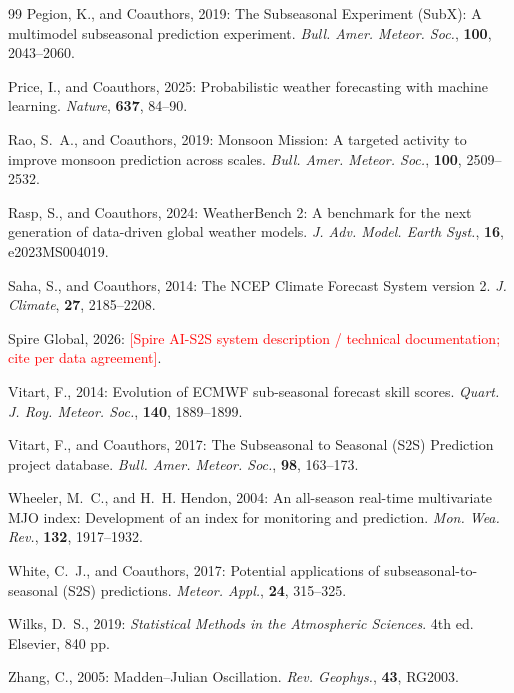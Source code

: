 \documentclass[11pt]{article}
\newcommand{\ph}[1]{\textcolor{red}{[#1]}}
\begin{document}
\begin{thebibliography}{99}
Pegion, K., and Coauthors, 2019: The Subseasonal Experiment (SubX):
A multimodel subseasonal prediction experiment. \textit{Bull. Amer.
Meteor. Soc.}, \textbf{100}, 2043--2060.

Price, I., and Coauthors, 2025: Probabilistic weather forecasting
with machine learning. \textit{Nature}, \textbf{637}, 84--90. %

Rao, S.~A., and Coauthors, 2019: Monsoon Mission: A targeted activity
to improve monsoon prediction across scales. \textit{Bull. Amer.
Meteor. Soc.}, \textbf{100}, 2509--2532. %

Rasp, S., and Coauthors, 2024: WeatherBench 2: A benchmark for the
next generation of data-driven global weather models. \textit{J. Adv.
Model. Earth Syst.}, \textbf{16}, e2023MS004019.

Saha, S., and Coauthors, 2014: The NCEP Climate Forecast System
version 2. \textit{J. Climate}, \textbf{27}, 2185--2208.

Spire Global, 2026: \ph{Spire AI-S2S system description / technical
documentation; cite per data agreement}. %

Vitart, F., 2014: Evolution of ECMWF sub-seasonal forecast skill
scores. \textit{Quart. J. Roy. Meteor. Soc.}, \textbf{140},
1889--1899.

Vitart, F., and Coauthors, 2017: The Subseasonal to Seasonal (S2S)
Prediction project database. \textit{Bull. Amer. Meteor. Soc.},
\textbf{98}, 163--173.

Wheeler, M.~C., and H.~H. Hendon, 2004: An all-season real-time
multivariate MJO index: Development of an index for monitoring and
prediction. \textit{Mon. Wea. Rev.}, \textbf{132}, 1917--1932.

White, C.~J., and Coauthors, 2017: Potential applications of
subseasonal-to-seasonal (S2S) predictions. \textit{Meteor. Appl.},
\textbf{24}, 315--325.

Wilks, D.~S., 2019: \textit{Statistical Methods in the Atmospheric
Sciences}. 4th ed. Elsevier, 840 pp. %

Zhang, C., 2005: Madden--Julian Oscillation. \textit{Rev. Geophys.},
\textbf{43}, RG2003.

\end{thebibliography}
\end{document}
